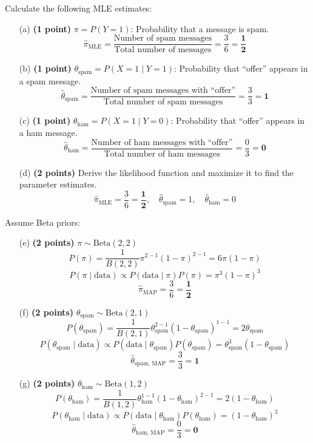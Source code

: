 \documentclass{article}
\begin{document}
\noindent Calculate the following MLE estimates:
\begin{itemize}
    \item[(a)] \textbf{(1 point)} $\pi = P(Y = 1)$: Probability that a message is spam.
    \[
    \hat{\pi}_{\text{MLE}} = \frac{\text{Number of spam messages}}{\text{Total number of messages}} = \frac{3}{6} = \mathbf{\frac{1}{2}}
    \]
    \item[(b)] \textbf{(1 point)} $\theta_{\text{spam}} = P(X = 1 \mid Y = 1)$: Probability that ``offer'' appears in a spam message.
    \[
    \hat{\theta}_{\text{spam}} = \frac{\text{Number of spam messages with ``offer''}}{\text{Total number of spam messages}} = \frac{3}{3} = \mathbf{1}
    \]
    \item[(c)] \textbf{(1 point)} $\theta_{\text{ham}} = P(X = 1 \mid Y = 0)$: Probability that ``offer'' appears in a ham message.
    \[
    \hat{\theta}_{\text{ham}} = \frac{\text{Number of ham messages with ``offer''}}{\text{Total number of ham messages}} = \frac{0}{3} = \mathbf{0}
    \]
    \item[(d)] \textbf{(2 points)} Derive the likelihood function and maximize it to find the parameter estimates. 
    \[
    \hat{\pi}_{\text{MLE}} = \frac{3}{6} = \mathbf{\frac{1}{2}}, \quad \hat{\theta}_{\text{spam}} = 1, \quad \hat{\theta}_{\text{ham}} = 0
    \]
\end{itemize}

\noindent Assume Beta priors:
\begin{itemize}
    \item[(e)] \textbf{(2 points)} $\pi \sim \text{Beta}(2, 2)$
    \[
    P(\pi) = \frac{1}{B(2, 2)} \pi^{2-1} (1 - \pi)^{2-1} = 6\pi(1 - \pi)
    \]
    \[
    P(\pi \mid \text{data}) \propto P(\text{data} \mid \pi) P(\pi) = \pi^3 (1 - \pi)^3
    \]
    \[
    \hat{\pi}_{\text{MAP}} = \frac{3}{6} = \mathbf{\frac{1}{2}}
    \]
    \item[(f)] \textbf{(2 points)} $\theta_{\text{spam}} \sim \text{Beta}(2, 1)$
    \[
    P(\theta_{\text{spam}}) = \frac{1}{B(2, 1)} \theta_{\text{spam}}^{2-1} (1 - \theta_{\text{spam}})^{1-1} = 2\theta_{\text{spam}}
    \]
    \[
    P(\theta_{\text{spam}} \mid \text{data}) \propto P(\text{data} \mid \theta_{\text{spam}}) P(\theta_{\text{spam}}) = \theta_{\text{spam}}^3 (1 - \theta_{\text{spam}})
    \]
    \[
    \hat{\theta}_{\text{spam, MAP}} = \frac{3}{3} = \mathbf{1}
    \]
    \item[(g)] \textbf{(2 points)} $\theta_{\text{ham}} \sim \text{Beta}(1, 2)$
    \[
    P(\theta_{\text{ham}}) = \frac{1}{B(1, 2)} \theta_{\text{ham}}^{1-1} (1 - \theta_{\text{ham}})^{2-1} = 2(1 - \theta_{\text{ham}})
    \]
    \[
    P(\theta_{\text{ham}} \mid \text{data}) \propto P(\text{data} \mid \theta_{\text{ham}}) P(\theta_{\text{ham}}) = (1 - \theta_{\text{ham}})^3
    \]
    \[
    \hat{\theta}_{\text{ham, MAP}} = \frac{0}{3} = \mathbf{0}
    \]
\end{itemize}
\end{document}

